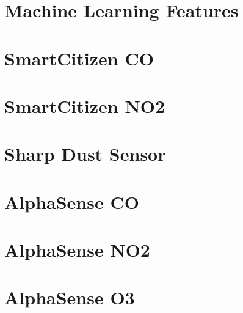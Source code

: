 \section{Machine Learning Features}

\FloatBarrier

\section{SmartCitizen CO}

\FloatBarrier

\section{SmartCitizen NO2}

\FloatBarrier

\section{Sharp Dust Sensor}

\FloatBarrier

\section{AlphaSense CO}

\FloatBarrier

\section{AlphaSense NO2}

\FloatBarrier

\section{AlphaSense O3}

\FloatBarrier


%

%
%

